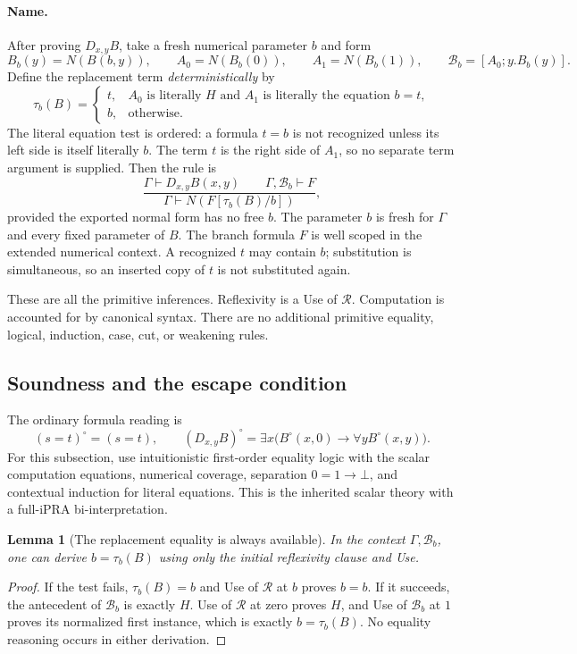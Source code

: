 \documentclass[11pt,a4paper]{article}
\newtheorem{lemma}[theorem]{Lemma}
\theoremstyle{definition}\newtheorem{definition}[theorem]{Definition}
\theoremstyle{remark}\newtheorem{remark}[theorem]{Remark}
\begin{document}
\paragraph{Name.}
After proving $D_{x,y}B$, take a fresh numerical parameter $b$ and form
\[
 B_b(y)=N(B(b,y)),\qquad
 A_0=N(B_b(0)),\qquad A_1=N(B_b(1)),
 \qquad \mathcal B_b=[A_0;y.B_b(y)].
\]
Define the replacement term \emph{deterministically} by
\[
 \tau_b(B)=
 \begin{cases}
 t,& A_0\text{ is literally }H\text{ and }A_1
       \text{ is literally the equation }b=t,\\
 b,&\text{otherwise}.
 \end{cases}
 \tag{First-instance test}\label{eq:first-instance-test}
\]
The literal equation test is ordered: a formula $t=b$ is not recognized
unless its left side is itself literally $b$. The term $t$ is the right
side of $A_1$, so no separate term argument is supplied. Then the rule is
\[
 \frac{\Gamma\vdash D_{x,y}B(x,y)\qquad
       \Gamma,\mathcal B_b\vdash F}
      {\Gamma\vdash N(F[\tau_b(B)/b])},
 \tag{Name}\label{eq:deterministic-name}
\]
provided the exported normal form has no free $b$. The parameter $b$ is
fresh for $\Gamma$ and every fixed parameter of $B$. The branch formula
$F$ is well scoped in the extended numerical context. A recognized $t$
may contain $b$; substitution is simultaneous, so an inserted copy of $t$
is not substituted again.

These are all the primitive inferences. Reflexivity is a Use of
$\mathcal R$. Computation is accounted for by canonical syntax. There
are no additional primitive equality, logical, induction, case, cut, or
weakening rules.

\subsection{Soundness and the escape condition}

The ordinary formula reading is
\[
 (s=t)^\circ=(s=t),\qquad
 (D_{x,y}B)^\circ=
       \exists x\bigl(B^\circ(x,0)\to\forall y B^\circ(x,y)\bigr).
\]
For this subsection, use intuitionistic first-order equality logic with
the scalar computation equations, numerical coverage, separation
$0=1\to\bot$, and contextual induction for literal equations.
This is the inherited scalar theory with a full-iPRA bi-interpretation.

\begin{lemma}[The replacement equality is always available]
\label{lem:det-replacement}
In the context $\Gamma,\mathcal B_b$, one can derive
$b=\tau_b(B)$ using only the initial reflexivity clause and Use.
\end{lemma}
\begin{proof}
If the test fails, $\tau_b(B)=b$ and Use of $\mathcal R$ at $b$ proves
$b=b$. If it succeeds, the antecedent of $\mathcal B_b$ is exactly
$H$. Use of $\mathcal R$ at zero proves $H$, and Use of $\mathcal B_b$
at $1$ proves its normalized first instance, which is exactly
$b=\tau_b(B)$. No equality reasoning occurs in either derivation.
\end{proof}
\end{document}
